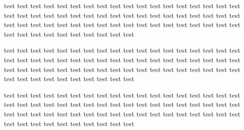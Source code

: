 \documentclass{article}
\newcommand\TestText{test test test test test test test test test test test test test test test test test test test test test test test test test test test test test test test test test test test test test test test test test test test test test test test test test test test test test test test test test test test test test test test test }
\begin{document}
\TestText
\begin{spacing}{1.6}
\TestText
\end{spacing}

\begin{spacing}{0.6}
\TestText
\end{spacing}
\end{document}
